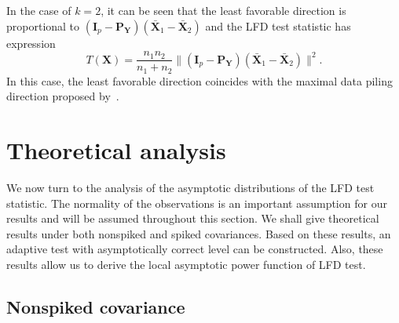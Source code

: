\documentclass[12pt]{article} %
\newcommand{\bX}{\mathbf{X}}
\newcommand{\bP}{\mathbf{P}}
\newcommand{\bY}{\mathbf{Y}}
\newcommand{\bI}{\mathbf{I}}
\theoremstyle{definition}
\begin{document}
In the case of $k=2$, it can be seen that the least favorable direction is proportional to
$
(\bI_p-\bP_{\bY}) (\bar{\bX}_1-\bar{\bX}_2)
$ and the LFD test statistic has expression
$$
T(\bX)=\frac{n_1 n_2}{n_1+n_2}\| (\bI_p-\bP_{\bY}) (\bar{\bX}_1-\bar{\bX}_2)\|^2.
$$
In this case, 
the least favorable direction coincides with the maximal data piling direction proposed by~\cite{Ahn2010}.

\section{Theoretical analysis}\label{THEO}
\setcounter{equation}{0} %
We now turn to the analysis of the asymptotic distributions of the LFD test statistic.
The normality of the observations is an important assumption for our results and will be assumed throughout this section.
We shall give theoretical results under both nonspiked and spiked covariances.
Based on these results, an adaptive test with asymptotically correct level can be constructed.
Also, these results allow us to derive the local asymptotic power function of LFD test.









\subsection{Nonspiked covariance}
\end{document}
